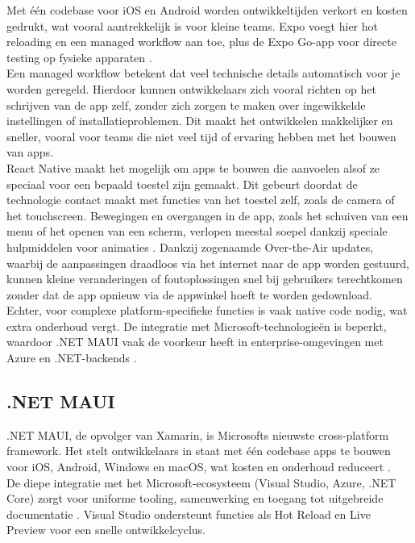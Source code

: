 Met één codebase voor iOS en Android worden ontwikkeltijden verkort en kosten gedrukt, wat vooral aantrekkelijk is voor kleine teams. Expo voegt hier hot reloading en een managed workflow aan toe, plus de Expo Go-app voor directe testing op fysieke apparaten \autocite{Ivanov2025}.\\

Een managed workflow betekent dat veel technische details automatisch voor je worden geregeld. Hierdoor kunnen ontwikkelaars zich vooral richten op het schrijven van de app zelf, zonder zich zorgen te maken over ingewikkelde instellingen of installatieproblemen. Dit maakt het ontwikkelen makkelijker en sneller, vooral voor teams die niet veel tijd of ervaring hebben met het bouwen van apps.\\

React Native maakt het mogelijk om apps te bouwen die aanvoelen alsof ze speciaal voor een bepaald toestel zijn gemaakt. Dit gebeurt doordat de technologie contact maakt met functies van het toestel zelf, zoals de camera of het touchscreen. Bewegingen en overgangen in de app, zoals het schuiven van een menu of het openen van een scherm, verlopen meestal soepel dankzij speciale hulpmiddelen voor animaties \autocite{Ivanov2025}. Dankzij zogenaamde Over-the-Air updates, waarbij de aanpassingen draadloos via het internet naar de app worden gestuurd, kunnen kleine veranderingen of foutoplossingen snel bij gebruikers terechtkomen zonder dat de app opnieuw via de appwinkel hoeft te worden gedownload.\\

Echter, voor complexe platform-specifieke functies is vaak native code nodig, wat extra onderhoud vergt. De integratie met Microsoft-technologieën is beperkt, waardoor .NET MAUI vaak de voorkeur heeft in enterprise-omgevingen met Azure en .NET-backends \autocite{Longe2025}.

\subsection{.NET MAUI}
.NET MAUI, de opvolger van Xamarin, is Microsofts nieuwste cross-platform framework. Het stelt ontwikkelaars in staat met één codebase apps te bouwen voor iOS, Android, Windows en macOS, wat kosten en onderhoud reduceert \autocite{Sheth2024}.\\

De diepe integratie met het Microsoft-ecosysteem (Visual Studio, Azure, .NET Core) zorgt voor uniforme tooling, samenwerking en toegang tot uitgebreide documentatie \autocite{Sheth2024}. Visual Studio ondersteunt functies als Hot Reload en Live Preview voor een snelle ontwikkelcyclus.\\

